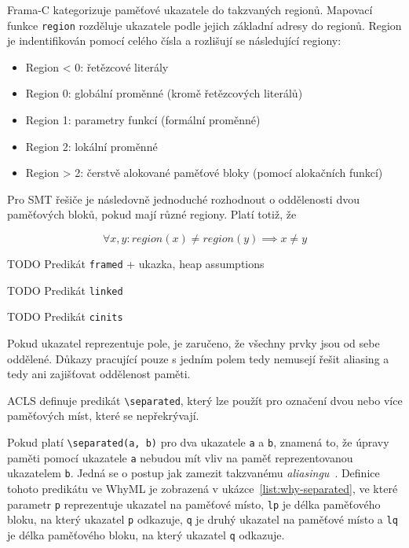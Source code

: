 Frama\mbox{-}C kategorizuje paměťové ukazatele do takzvaných regionů.
Mapovací funkce \texttt{region} rozděluje ukazatele podle jejich základní adresy do regionů.
Region je indentifikován pomocí celého čísla a rozlišují se následující regiony:

\begin{itemize}
    \item Region < 0: řetězcové literály
    \item Region 0: globální proměnné (kromě řetězcových literálů)
    \item Region 1: parametry funkcí (formální proměnné)
    \item Region 2: lokální proměnné
    \item Region > 2: čerstvě alokované paměťové bloky (pomocí alokačních funkcí)
\end{itemize}

Pro SMT řešiče je následovně jednoduché rozhodnout o oddělenosti dvou paměťových bloků,
pokud mají různé regiony.
Platí totiž, že

\begin{equation*}
    \forall x, y : region(x) \neq region(y) \implies x \neq y
\end{equation*}

TODO Predikát \texttt{framed} + ukazka, heap assumptions

TODO Predikát \texttt{linked}

TODO Predikát \texttt{cinits}

Pokud ukazatel reprezentuje pole,
je zaručeno, že všechny prvky jsou od sebe oddělené.
Důkazy pracující pouze s jedním polem tedy nemusejí řešit aliasing
a tedy ani zajišťovat oddělenost paměti.

ACLS definuje predikát \texttt{\textbackslash separated},
který lze použít pro označení dvou nebo více paměťových míst,
které se nepřekrývají.


Pokud platí \texttt{\textbackslash separated(a, b)} pro dva ukazatele \texttt{a} a \texttt{b},
znamená to, že úpravy paměti pomocí ukazatele \texttt{a}
nebudou mít vliv na paměť reprezentovanou ukazatelem \texttt{b}.
Jedná se o postup jak zamezit takzvanému \textit{aliasingu}~\cite{ACSLSpec}.
Definice tohoto predikátu ve WhyML je zobrazená v ukázce~\ref{list:why-separated},
ve které parametr \texttt{p} reprezentuje ukazatel na paměťové místo,
\texttt{lp} je délka paměťového bloku, na který ukazatel \texttt{p} odkazuje,
\texttt{q} je druhý ukazatel na paměťové místo a \texttt{lq} je délka paměťového bloku,
na který ukazatel \texttt{q} odkazuje.

